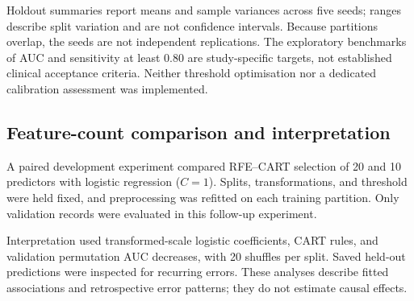 Holdout summaries report means and sample variances across five seeds; ranges describe split variation and are not confidence intervals. Because partitions overlap, the seeds are not independent replications. The exploratory benchmarks of AUC and sensitivity at least 0.80 are study-specific targets, not established clinical acceptance criteria. Neither threshold optimisation nor a dedicated calibration assessment was implemented.

\subsection{Feature-count comparison and interpretation}
A paired development experiment compared RFE--CART selection of 20 and 10 predictors with logistic regression ($C=1$). Splits, transformations, and threshold were held fixed, and preprocessing was refitted on each training partition. Only validation records were evaluated in this follow-up experiment.

Interpretation used transformed-scale logistic coefficients, CART rules, and validation permutation AUC decreases, with 20 shuffles per split. Saved held-out predictions were inspected for recurring errors. These analyses describe fitted associations and retrospective error patterns; they do not estimate causal effects.
